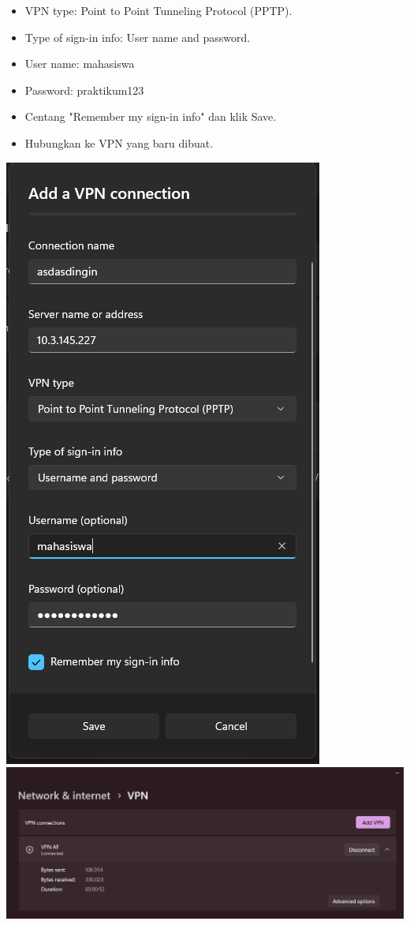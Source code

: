 \begin{enumerate}
\begin{enumerate}
\begin{itemize}
            \item VPN type: Point to Point Tunneling Protocol (PPTP).
            \item Type of sign-in info: User name and password.
            \item User name: mahasiswa
            \item Password: praktikum123
            \item Centang "Remember my sign-in info" dan klik Save.
            \item Hubungkan ke VPN yang baru dibuat.
        \end{itemize}
        \begin{center}
            \includegraphics[scale=0.5]{P1/img/10 Konfigurasi PPTP Client di Laptop (Windows).png}
            \includegraphics[scale=0.3]{P1/img/12 Hasil Konfigurasi PPTP Client di Laptop (Windows).png}        

\end{center}
\end{enumerate}
\end{enumerate}

